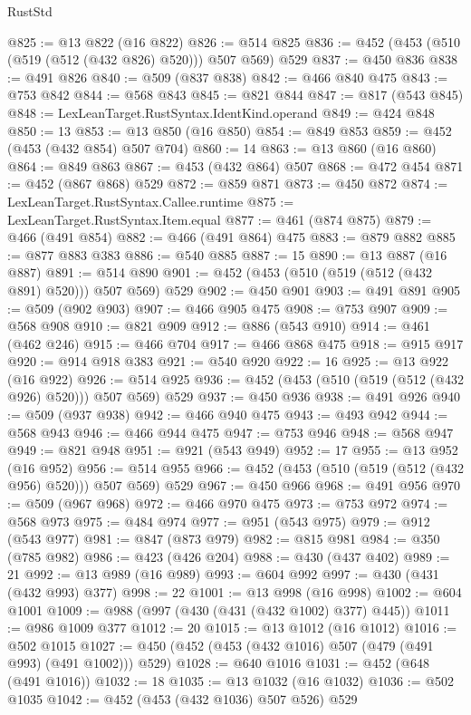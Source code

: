 \begin{lexlean}{RustStd}
\begin{coremodule}
@825 := @13 @822 (@16 @822)
@826 := @514 @825
@836 := @452 (@453 (@510 (@519 (@512 (@432 @826) @520))) @507 @569) @529
@837 := @450 @836
@838 := @491 @826
@840 := @509 (@837 @838)
@842 := @466 @840 @475
@843 := @753 @842
@844 := @568 @843
@845 := @821 @844
@847 := @817 (@543 @845)
@848 := LexLeanTarget.RustSyntax.IdentKind.operand
@849 := @424 @848
@850 := 13
@853 := @13 @850 (@16 @850)
@854 := @849 @853
@859 := @452 (@453 (@432 @854) @507 @704)
@860 := 14
@863 := @13 @860 (@16 @860)
@864 := @849 @863
@867 := @453 (@432 @864) @507
@868 := @472 @454
@871 := @452 (@867 @868) @529
@872 := @859 @871
@873 := @450 @872
@874 := LexLeanTarget.RustSyntax.Callee.runtime
@875 := LexLeanTarget.RustSyntax.Item.equal
@877 := @461 (@874 @875)
@879 := @466 (@491 @854)
@882 := @466 (@491 @864) @475
@883 := @879 @882
@885 := @877 @883 @383
@886 := @540 @885
@887 := 15
@890 := @13 @887 (@16 @887)
@891 := @514 @890
@901 := @452 (@453 (@510 (@519 (@512 (@432 @891) @520))) @507 @569) @529
@902 := @450 @901
@903 := @491 @891
@905 := @509 (@902 @903)
@907 := @466 @905 @475
@908 := @753 @907
@909 := @568 @908
@910 := @821 @909
@912 := @886 (@543 @910)
@914 := @461 (@462 @246)
@915 := @466 @704
@917 := @466 @868 @475
@918 := @915 @917
@920 := @914 @918 @383
@921 := @540 @920
@922 := 16
@925 := @13 @922 (@16 @922)
@926 := @514 @925
@936 := @452 (@453 (@510 (@519 (@512 (@432 @926) @520))) @507 @569) @529
@937 := @450 @936
@938 := @491 @926
@940 := @509 (@937 @938)
@942 := @466 @940 @475
@943 := @493 @942
@944 := @568 @943
@946 := @466 @944 @475
@947 := @753 @946
@948 := @568 @947
@949 := @821 @948
@951 := @921 (@543 @949)
@952 := 17
@955 := @13 @952 (@16 @952)
@956 := @514 @955
@966 := @452 (@453 (@510 (@519 (@512 (@432 @956) @520))) @507 @569) @529
@967 := @450 @966
@968 := @491 @956
@970 := @509 (@967 @968)
@972 := @466 @970 @475
@973 := @753 @972
@974 := @568 @973
@975 := @484 @974
@977 := @951 (@543 @975)
@979 := @912 (@543 @977)
@981 := @847 (@873 @979)
@982 := @815 @981
@984 := @350 (@785 @982)
@986 := @423 (@426 @204)
@988 := @430 (@437 @402)
@989 := 21
@992 := @13 @989 (@16 @989)
@993 := @604 @992
@997 := @430 (@431 (@432 @993) @377)
@998 := 22
@1001 := @13 @998 (@16 @998)
@1002 := @604 @1001
@1009 := @988 (@997 (@430 (@431 (@432 @1002) @377) @445))
@1011 := @986 @1009 @377
@1012 := 20
@1015 := @13 @1012 (@16 @1012)
@1016 := @502 @1015
@1027 := @450 (@452 (@453 (@432 @1016) @507 (@479 (@491 @993) (@491 @1002))) @529)
@1028 := @640 @1016
@1031 := @452 (@648 (@491 @1016))
@1032 := 18
@1035 := @13 @1032 (@16 @1032)
@1036 := @502 @1035
@1042 := @452 (@453 (@432 @1036) @507 @526) @529

\end{coremodule}
\end{lexlean}
